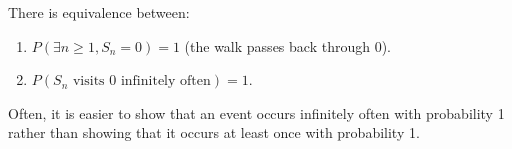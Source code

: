 \begin{theorem}[Equivalence]
There is equivalence between:
\begin{enumerate}
    \item $P(\exists n \ge 1, S_n=0) = 1$ (the walk passes back through 0).
\item $P(S_n \text{ visits 0 infinitely often}) = 1$.
\end{enumerate}
\end{theorem}%
\begin{remark}
Often, it is easier to show that an event occurs infinitely often with probability 1 rather than showing that it occurs at least once with probability 1.
\end{remark}%
